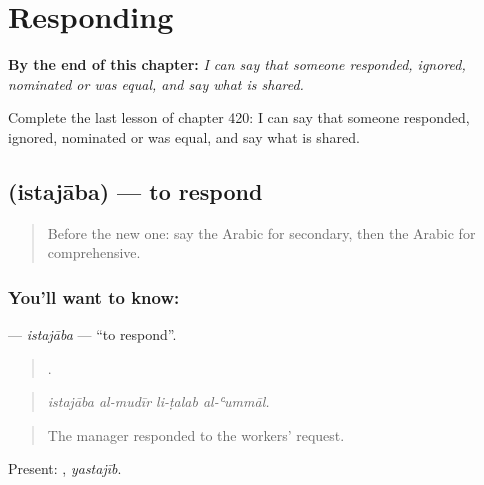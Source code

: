 
\chapter{Responding}
\label{ch:ar-responding}

\begin{chapteropening}
\textbf{By the end of this chapter:} \emph{I can say that someone responded, ignored, nominated or was equal, and say what is shared.}

Complete the last lesson of chapter 420: I can say that someone responded, ignored, nominated or was equal, and say what is shared.
\end{chapteropening}

\section[\texorpdfstring{\ar{استجاب} (istajāba)}{استجاب (istajāba)}]{ (istajāba) — to respond}

\label{lesson:AR-C420-istajaba}



\begin{quote}
Before the new one: say the Arabic for secondary, then the Arabic for comprehensive.
\end{quote}

\subsection*{You'll want to know: }
\textbf{} — \emph{istajāba} — \textquotedblleft{}to respond\textquotedblright{}.

\begin{quote}
   .
\end{quote}

\begin{quote}
\emph{istajāba al-mudīr li-ṭalab al-ʿummāl.}
\end{quote}

\begin{quote}
The manager responded to the workers' request.
\end{quote}

Present: , \emph{yastajīb}.

